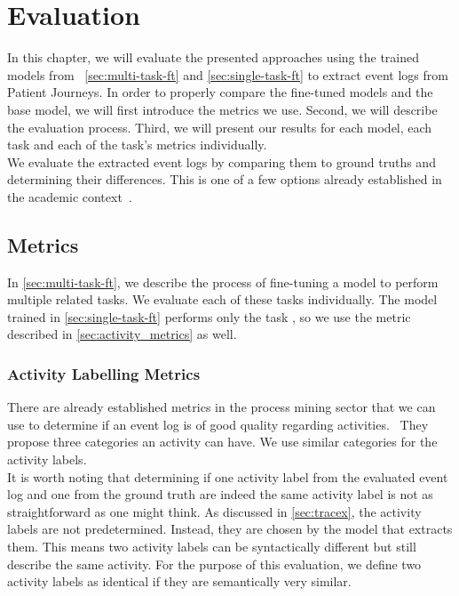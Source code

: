 \section{Evaluation}\label{sec:eval}
In this chapter, we will evaluate the presented approaches using the trained models from ~\autoref{sec:multi-task-ft} and \autoref{sec:single-task-ft} to extract event logs from Patient Journeys. In order to properly compare the fine-tuned models and the base model, we will first introduce the metrics we use. Second, we will describe the evaluation process. Third, we will present our results for each model, each task and each of the task's metrics individually.\\
We evaluate the extracted event logs by comparing them to ground truths and determining their differences. This is one of a few options already established in the academic context~\cite{latif_fine-tuning_2024}.

\subsection{Metrics}\label{sec:metrics}
In \autoref{sec:multi-task-ft}, we describe the process of fine-tuning a model to perform multiple related tasks. We evaluate each of these tasks individually. The model trained in \autoref{sec:single-task-ft} performs only the task , so we use the metric described in \autoref{sec:activity_metrics} as well.

\subsubsection{Activity Labelling Metrics}\label{sec:activity_metrics}
There are already established metrics in the process mining sector that we can use to determine if an event log is of good quality regarding activities.~\cite{van_der_aalst_process_2016, carmona_conformance_2018} They propose three categories an activity can have. We use similar categories for the activity labels.\\
It is worth noting that determining if one activity label from the evaluated event log and one from the ground truth are indeed the same activity label is not as straightforward as one might think. As discussed in \autoref{sec:tracex}, the activity labels are not predetermined. Instead, they are chosen by the model that extracts them. This means two activity labels can be syntactically different but still describe the same activity. For the purpose of this evaluation, we define two activity labels as identical if they are semantically very similar.
